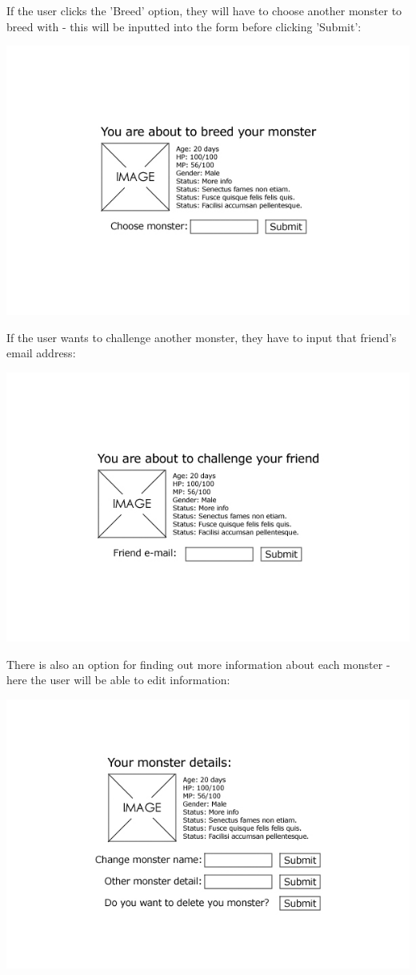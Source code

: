 \documentclass[a4paper]{article}
\begin{document}
If the user clicks the 'Breed' option, they will have to choose another monster to breed with - this will be inputted into the form before clicking 'Submit':

\includegraphics[width=\textwidth]{img/UI10.jpg}

If the user wants to challenge another monster, they have to input that friend's email address:

\includegraphics[width=\textwidth]{img/UI11.jpg}
\clearpage

There is also an option for finding out more information about each monster - here the user will be able to edit information:

\includegraphics[width=\textwidth]{img/UI12.jpg}
\clearpage
\end{document}
